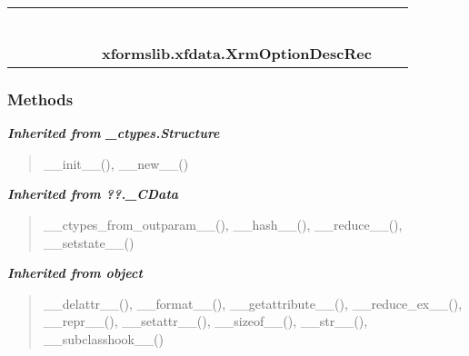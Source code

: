     \label{xformslib:xfdata:XrmOptionDescRec}
\begin{tabular}{cccccccccc}
\multicolumn{2}{r}{\settowidth{\BCL}{object}\multirow{2}{\BCL}{object}}
&&
&&
&&
  \\\cline{3-3}
  &&\multicolumn{1}{c|}{}
&&
&&
&&
  \\
\multicolumn{4}{r}{\settowidth{\BCL}{??.\_CData}\multirow{2}{\BCL}{??.\_CData}}
&&
&&
  \\\cline{5-5}
  &&&&\multicolumn{1}{c|}{}
&&
&&
  \\
\multicolumn{6}{r}{\settowidth{\BCL}{\_ctypes.Structure}\multirow{2}{\BCL}{\_ctypes.Structure}}
&&
  \\\cline{7-7}
  &&&&&&\multicolumn{1}{c|}{}
&&
  \\
&&&&&&\multicolumn{2}{l}{\textbf{xformslib.xfdata.XrmOptionDescRec}}
\end{tabular}



  \subsubsection{Methods}


\large{\textbf{\textit{Inherited from \_ctypes.Structure}}}

\begin{quote}
\_\_init\_\_(), \_\_new\_\_()
\end{quote}

\large{\textbf{\textit{Inherited from ??.\_CData}}}

\begin{quote}
\_\_ctypes\_from\_outparam\_\_(), \_\_hash\_\_(), \_\_reduce\_\_(), \_\_setstate\_\_()
\end{quote}

\large{\textbf{\textit{Inherited from object}}}

\begin{quote}
\_\_delattr\_\_(), \_\_format\_\_(), \_\_getattribute\_\_(), \_\_reduce\_ex\_\_(), \_\_repr\_\_(), \_\_setattr\_\_(), \_\_sizeof\_\_(), \_\_str\_\_(), \_\_subclasshook\_\_()
\end{quote}

